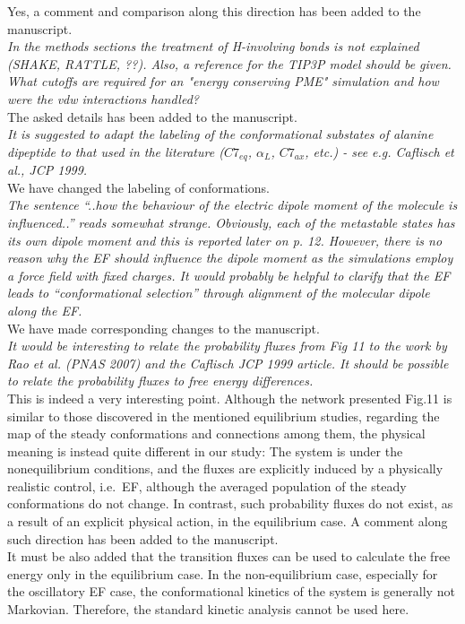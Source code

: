 \documentclass[]{revtex4-1}
\begin{document}
Yes, a comment and comparison along this direction has been added to the
manuscript.\\

\emph{ In the methods sections the treatment of H-involving bonds is
  not explained (SHAKE, RATTLE, ??). Also, a reference for the TIP3P
  model should be given. What cutoffs are required for an "energy
  conserving PME" simulation and how were the vdw interactions
  handled?  }\\

The asked details has been added to the manuscript.\\

\emph{
It is suggested to adapt the labeling of the conformational substates
of alanine dipeptide to that used in the literature ($C7_{eq}$, $\alpha_L$,
$C7_{ax}$, etc.) - see e.g. Caflisch et al., JCP 1999.
}\\

We have changed the labeling of conformations.\\

\emph{
The sentence ``..how the behaviour of the electric dipole moment of the
molecule is influenced..'' reads somewhat strange. Obviously, each of
the metastable states has its own dipole moment and this is reported
later on p. 12. However, there is no reason why the EF should
\emph{influence} the dipole moment as the simulations employ a force field
with fixed charges. It would probably be helpful to clarify that the
EF leads to ``conformational selection'' through alignment of the
molecular dipole along the EF.
}\\

We have made corresponding changes to the manuscript.\\

\emph{ It would be interesting to relate the probability fluxes from
  Fig 11 to the work by Rao et al. (PNAS 2007) and the Caflisch JCP
  1999 article. It should be possible to relate the probability fluxes
  to free energy differences.}\\

This is indeed a very interesting point.
Although the network presented Fig.11 is similar to those
discovered in the mentioned equilibrium studies,
regarding the map of the steady conformations and connections among them,
the physical meaning is instead quite different in our study:
The system is under the nonequilibrium conditions, and
the fluxes are explicitly induced by a physically realistic control, i.e.~EF, although the averaged population of the steady conformations do not change. In contrast,
such probability fluxes do not exist, as a result of an explicit physical action, in the equilibrium case.
A comment along such direction has been added to the
manuscript.\\

It must be also added that the transition fluxes can be used to calculate the free energy only in
the equilibrium case. In the non-equilibrium case, especially for the
oscillatory EF case, the conformational kinetics of the system is generally
not Markovian. Therefore, the standard kinetic analysis cannot be used
here.
\end{document}
